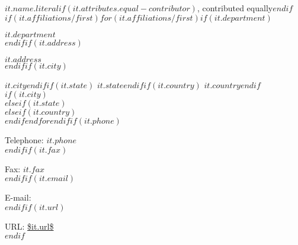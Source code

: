 $it.name.literal$$if(it.attributes.equal-contributor)$, contributed equally$endif$\\$if(it.affiliations/first)$$for(it.affiliations/first)$$if(it.department)$

$it.department$\\$endif$$if(it.address)$

$it.address$\\$endif$$if(it.city)$

$it.city$$endif$$if(it.state)$ $it.state$$endif$$if(it.country)$ $it.country$$endif$$if(it.city)$\\$elseif(it.state)$\\$elseif(it.country)$\\$endif$$endfor$$endif$$if(it.phone)$

Telephone: $it.phone$\\$endif$$if(it.fax)$

Fax: $it.fax$\\$endif$$if(it.email)$

E-mail: \\$endif$$if(it.url)$

URL: \url{$it.url$}\\$endif$

\\~

